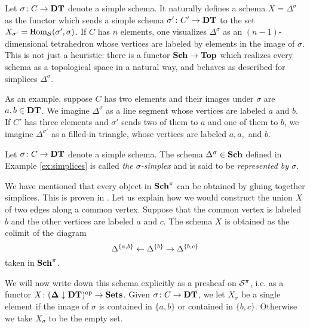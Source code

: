 \documentclass{amsart}
\begin{document}
\begin{example}\label{ex:simplices}

Let $\sigma\colon C\rightarrow{\bf DT}$ denote a simple schema.  It naturally defines a schema $X=\Delta^\sigma$ as the functor which sends a simple schema $\sigma'\colon C'\rightarrow{\bf DT}$ to the set $X_{\sigma'}=\textnormal{Hom}_\mathcal{S}(\sigma',\sigma)$.  If $C$ has $n$ elements, one visualizes $\Delta^\sigma$ as an $(n-1)$-dimensional tetrahedron whose vertices are labeled by elements in the image of $\sigma$.  This is not just a heuristic: there is a functor ${\bf Sch}\rightarrow{\bf Top}$ which realizes every schema as a topological space in a natural way, and behaves as described for simplices $\Delta^\sigma$.

As an example, suppose $C$ has two elements and their images under $\sigma$ are $a,b\in{\bf DT}$.  We imagine $\Delta^\sigma$ as a line segment whose vertices are labeled $a$ and $b$.  If $C'$ has three elements and $\sigma'$ sends two of them to $a$ and one of them to $b$, we imagine $\Delta^{\sigma'}$ as a filled-in triangle, whose vertices are labeled $a,a,$ and $b$. 

\end{example}

\begin{definition}\label{def:simplex}

Let $\sigma\colon C\rightarrow{\bf DT}$ denote a simple schema.  The schema $\Delta^\sigma\in{\bf Sch}$ defined in Example \ref{ex:simplices} is called {\em the $\sigma$-simplex} and is said to be {\em represented by $\sigma$}.

\end{definition}

\begin{example}

We have mentioned that every object in ${\bf Sch}^\pi$ can be obtained by gluing together simplices.  This is proven in \cite[2.15.6]{Bor1}.  Let us explain how we would construct the union $X$ of two edges along a common vertex.  Suppose that the common vertex is labeled $b$ and the other vertices are labeled $a$ and $c$.  The schema $X$ is obtained as the colimit of the diagram $$\Delta^{\{a,b\}}\leftarrow\Delta^{\{b\}}\rightarrow\Delta^{\{b,c\}}$$ taken in ${\bf Sch}^\pi$.

We will now write down this schema explicitly as a presheaf on $\mathcal{S}^\pi$, i.e. as a functor $X\colon({\bf \Delta}\downarrow{\bf DT})^\textnormal{op}\rightarrow{\bf Sets}$.  Given $\sigma\colon C\rightarrow{\bf DT}$, we let $X_\sigma$ be a single element if the image of $\sigma$ is contained in $\{a,b\}$ or contained in $\{b,c\}$.  Otherwise we take $X_\sigma$ to be the empty set.

\end{example}
\end{document}
